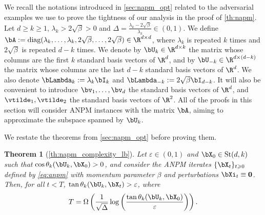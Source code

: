 \documentclass{article}
\theoremstyle{plain}
\newtheorem{theorem}{Theorem}[section]
\theoremstyle{definition}
\theoremstyle{remark}
\begin{document}
We recall the notations introduced in \cref{sec:napm_opt} related to the adversarial examples we use to prove the tightness of our analysis in the proof of \cref{th:napm}. Let $d\geqslant k\geqslant 1$, $\lambda_k > 2\sqrt{\beta} > 0$ and $\Delta = \frac{\lambda_k-2\sqrt{\beta}}{\lambda_k} \in (0,1)$. We define $\bA := \mathrm{diag}(\lambda_k,\dots,\lambda_k,2\sqrt{\beta},\dots,2\sqrt{\beta}) \in \R^{d\times d}$, where $\lambda_k$ is repeated $k$ times and $2\sqrt{\beta}$ is repeated $d-k$ times. We denote by $\bU_k \in \R^{d\times k}$ the matrix whose columns are the first $k$ standard basis vectors of $\R^d$, and by $\bU_{-k} \in \R^{d\times (d-k)}$ the matrix whose columns are the last $d-k$ standard basis vectors of $\R^d$. We also denote $\bLambda_k := \lambda_k\bI_k$ and $\bLambda_{-k} := 2\sqrt{\beta}\bI_{d-k}$. It will also be convenient to introduce $\bv_1,\dots, \bv_d$ the standard basis vectors of $\R^d$, and $\vtilde_1, \vtilde_2$ the standard basis vectors of $\R^2$. All of the proofs in this section will consider ANPM instances with the matrix $\bA$, aiming to approximate the subspace spanned by $\bU_k$.

We restate the theorems from \cref{sec:napm_opt} before proving them. 

\begin{theorem}[\cref{th:napm_complexity_lb}]
   Let $\varepsilon \in (0,1)$ and $\bX_0 \in \mathrm{St}(d,k)$ such that $\cos\theta_k(\bU_k, \bX_0) > 0$, and consider the ANPM iterates $\{\bX_t\}_{t\geqslant 0}$ defined by \eqref{eq:anpm} with momentum parameter $\beta$ and perturbations $\bXi_t \equiv \mathbf{0}$. Then, for all $t < T$, $\tan\theta_k(\bU_k, \bX_t) > \varepsilon$, where
  \begin{align*}
    T = \Omega\left(\frac{1}{\sqrt{\Delta}} \log\left(\frac{\tan\theta_k(\bU_k, \bX_0)}{\varepsilon}\right)\right).
  \end{align*}
\end{theorem}
\end{document}
